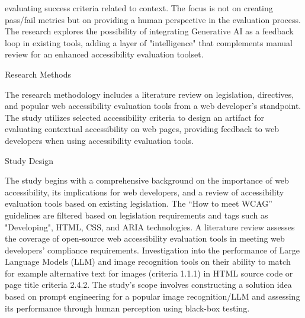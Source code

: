 evaluating success criteria related to context. The focus is not on creating pass/fail metrics but on providing a human perspective in the evaluation process. The research explores the possibility of integrating Generative AI as a feedback loop in existing tools, adding a layer of "intelligence" that complements manual review for an enhanced accessibility evaluation toolset.

Research Methods

The research methodology includes a literature review on legislation, directives, and popular web accessibility evaluation tools from a web developer's standpoint. The study utilizes selected accessibility criteria to design an artifact for evaluating contextual accessibility on web pages, providing feedback to web developers when using accessibility evaluation tools.

Study Design

The study begins with a comprehensive background on the importance of web accessibility, its implications for web developers, and a review of accessibility evaluation tools based on existing legislation. The “How to meet WCAG” guidelines are filtered based on legislation requirements and tags such as "Developing", HTML, CSS, and ARIA technologies. A literature review assesses the coverage of open-source web accessibility evaluation tools in meeting web developers' compliance requirements. Investigation into the performance of Large Language Models (LLM) and image recognition tools on their ability to match for example alternative text for images (criteria 1.1.1) in HTML source code or page title criteria 2.4.2. The study's scope involves constructing a solution idea based on prompt engineering for a popular image recognition/LLM and assessing its performance through human perception using black-box testing.